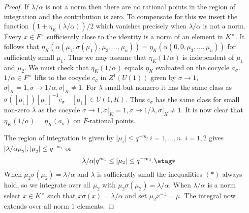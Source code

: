 \documentclass{memo-l}
\theoremstyle{definition}
\theoremstyle{remark}
\numberwithin{section}{chapter}
\numberwithin{equation}{chapter}
\begin{document}
\begin{proof}
   If ${\lambda}/{\alpha}$ is not a norm then there are no rational points
in the region of integration and the contribution is zero.  To compensate
for this we insert the function $(1+{\eta}_{K}({\lambda}/{\alpha}))/2$
which vanishes precisely when ${\lambda}/{\alpha}$ is not a norm.  Every
$x \in F^{\times}$ sufficiently close to the identity is a norm of an
element in $K^{\times}$.  It follows that
${\eta}_{K}({\alpha}({\mu}_{1},{\sigma}({\mu}_{1}),{\mu}_{3},\ldots
,{\mu}_{n})) = {\eta}_{K}({\alpha}(0,0,{\mu}_{3},\ldots ,{\mu}_{n}))$ for
sufficiently small ${\mu}_{1}$.  Thus we may assume that
${\eta}_{K}(1/{\alpha})$ is independent of ${\mu}_{1}$ and ${\mu}_{2}$.  We
must check that ${\eta}_{K}(1/{\alpha})$ equals ${\eta}_{K}$ evaluated on
the cocycle $a_{{\sigma}}$.  $1/{\alpha}  \in  F^{\times}$ lifts to the cocycle
$c_{{\sigma}}$ in $Z^{1}(U(1))$ given by ${\sigma} {\to} 1$, ${\sigma}\vert
_{K} = 1, {\sigma} {\to} 1/{\alpha}, {\sigma}\vert _{K} \ne 1$.  For
${\lambda}$ small but nonzero it has the same class as
${\sigma}([{\mu}_{1}])[{\mu}_{1}]^{-1}c_{{\sigma}} \quad [{\mu}_{1}]  \in 
U(1,K)$.  Thus $c_{{\sigma}}$ has the same class for small non-zero
${\lambda}$ as the cocycle ${\sigma} {\to} 1, {\sigma}\vert _{K} = 1,
{\sigma} {\to} 1/{\lambda}, {\sigma}\vert _{K} \ne 1$.  It is now clear
that ${\eta}_{K}(1/{\alpha}) = {\eta}_{K}(a_{{\sigma}})$ on $F$-rational
points.

   The region of integration is given by $\vert {\mu}_{i}\vert \le 
q^{-m_{i}} \ i = 1,\ldots ,n$.  $i = 1,2$ gives $\vert
{\lambda}/{\alpha}{\mu}_{2}\vert , \vert {\mu}_{2}\vert \le 
q^{-m_{1}}$ or
\begin{equation}
\vert {\lambda}/{\alpha}\vert q^{m_{1}} \le \vert
{\mu}_{2}\vert \le q^{-m_{1}} .	  \etag *
\end{equation}
When ${\mu}_{2}{\sigma}({\mu}_{2}) = {\lambda}/{\alpha}$ and ${\lambda}$ is
sufficiently small the inequalities $(*)$ always hold, so we integrate over
all ${\mu}_{2}$ with ${\mu}_{2}{\sigma}({\mu}_{2}) = {\lambda}/{\alpha}$.
When ${\lambda}/{\alpha}$ is a norm select $x  \in  K^{\times}$ such that
$x{\sigma}(x) = {\lambda}/{\alpha}$ and set ${\mu}_{2}x^{-1} = {\mu}$.  The
integral now extends over all norm $1$ elements.


\end{proof}
\end{document}
